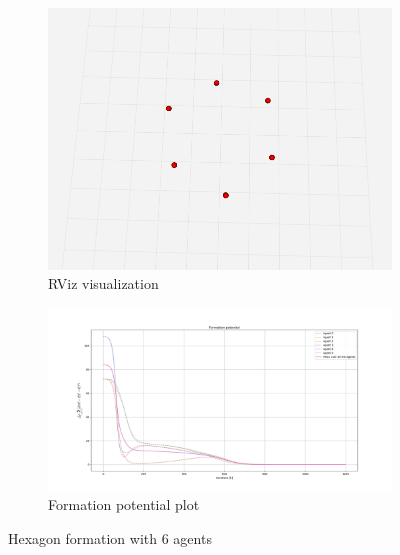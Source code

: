 \documentclass[a4paper,11pt,oneside]{book}
\begin{document}
\begin{figure}
\centering
	\begin{subfigure}{0.49\textwidth}	
	\includegraphics[width=\textwidth]{hexagon_rviz}
	\caption{RViz visualization}
	\end{subfigure}
\hfill
	\begin{subfigure}{0.49\textwidth}	
	\includegraphics[width=\textwidth]{Task-2.2_Formation-p_No-Coll-Avoid_Hexagon}
	\caption{Formation potential plot}
	\end{subfigure}
\caption{Hexagon formation with $6$ agents}
\label{Hexagon}
\end{figure}
\end{document}

